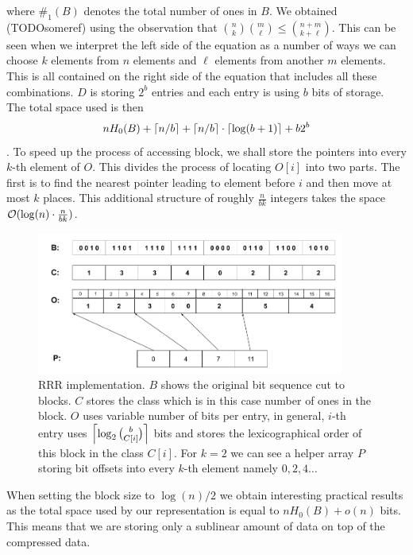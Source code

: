 where $\#_1(B)$ denotes the total number of ones in $B$. We obtained (TODOsomeref) using the
observation that ${n\choose k} {m\choose \ell} \leq {n+m\choose k+\ell}$. This can be seen
when we interpret the left side of the equation as a number of ways we can choose $k$ elements
from $n$ elements and $\ell$ elements from another $m$ elements. This is all contained on the
right side of the equation that includes all these combinations. $D$ is storing $2^b$ entries
and each entry is using $b$ bits of storage.
The total space used is then $$nH_0(B) + \left\lceil n/b \right\rceil + \left\lceil n/b \right\rceil \cdot \left\lceil \log(b+1) \right\rceil + b2^b$$.
To speed up the process of accessing block, we shall store the pointers into every $k$-th element
of $O$. This divides the process of locating $O[i]$ into two parts. The first is to find the nearest
pointer leading to element before $i$ and then move at most $k$ places. This additional structure of
roughly $\frac{n}{bk}$ integers takes the space $\mathcal{O}(\log(n)\cdot \frac{n}{bk})$.

\begin{figure}
	\centerline{
		\includegraphics[width=0.9\textwidth, height=0.3\textheight]{images/rrr}
	}
	\caption[TODO]{RRR implementation. $B$ shows the original bit sequence cut to
    blocks. $C$ stores the class which is in this case number of ones in the block.
    $O$ uses variable number of bits per entry, in general, $i$-th entry uses
    $\left\lceil \log_2{b\choose C[i]} \right\rceil$ bits and stores the lexicographical order
    of this block in the class $C[i]$. For $k=2$ we can see a helper array $P$
    storing bit offsets into every $k$-th element namely $0, 2, 4\ldots$
	}
	\label{obr:RRRFinal}
\end{figure}

When setting the block size to $\log(n)/2$ we obtain interesting practical results as
the total space used by our representation is equal to $nH_0(B) + o(n)$ bits. This means
that we are storing only a sublinear amount of data on top of the compressed data.

